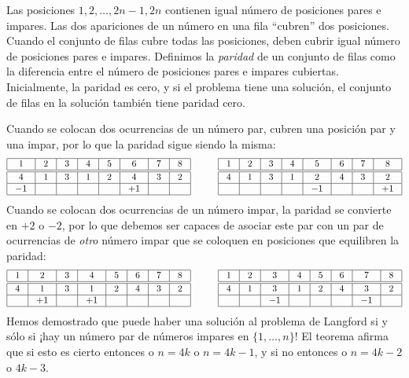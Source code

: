 Las posiciones $1,2,\ldots,2n-1,2n$ contienen igual número de posiciones pares e impares. Las dos apariciones de un número en una fila ``cubren'' dos posiciones. Cuando el conjunto de filas cubre todas las posiciones, deben cubrir igual número de posiciones pares e impares. Definimos la \emph{paridad} de un conjunto de filas como la diferencia entre el número de posiciones pares e impares cubiertas. Inicialmente, la paridad es cero, y si el problema tiene una solución, el conjunto de filas en la solución también tiene paridad cero.

Cuando se colocan dos ocurrencias de un número par, cubren una posición par y una impar, por lo que la paridad sigue siendo la misma:
\[
\addtolength{\arraycolsep}{4pt}
\begin{array}{|c|c|c|c|c|c|c|c|}
\hline
1&2&3&4&5&6&7&8\\
\hline\hline
4&1&3&1&2&4&3&2\\\hline
-1&&&&&+1&&\\\hline
\end{array}
\hspace{3em}
\begin{array}{|c|c|c|c|c|c|c|c|}
\hline
1&2&3&4&5&6&7&8\\
\hline\hline
4&1&3&1&2&4&3&2\\\hline
&&&&-1&&&+1\\\hline
\end{array}
\]
Cuando se colocan dos ocurrencias de un número impar, la paridad se convierte en $+2$ o $-2$, por lo que debemos ser capaces de asociar este par con un par de ocurrencias de \emph{otro} número impar que se coloquen en posiciones que equilibren la paridad:
\[
\addtolength{\arraycolsep}{4pt}
\begin{array}{|c|c|c|c|c|c|c|c|}
\hline
1&2&3&4&5&6&7&8\\
\hline\hline
4&1&3&1&2&4&3&2\\\hline
&+1&&+1&&&&\\\hline
\end{array}
\hspace{3em}
\begin{array}{|c|c|c|c|c|c|c|c|}
\hline
1&2&3&4&5&6&7&8\\
\hline\hline
4&1&3&1&2&4&3&2\\\hline
&&-1&&&&-1&\\\hline
\end{array}
\]
Hemos demostrado que puede haber una solución al problema de Langford si y sólo si ¡hay un número par de números impares en $\{1,\ldots,n\}$!
El teorema afirma que si esto es cierto entonces o $n=4k$ o $n=4k-1$, y si no entonces o $n=4k-2$ o $4k-3$.


